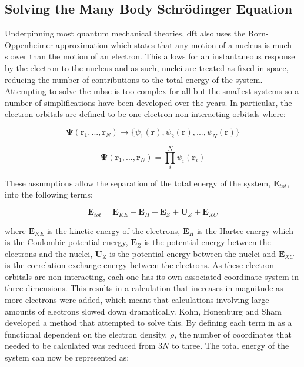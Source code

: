 \subsection{Solving the Many Body Schr\"{o}dinger Equation}
Underpinning most quantum mechanical theories, \acrshort{dft} also uses the Born\nobreakdash-Oppenheimer approximation which states that any motion of a nucleus is much slower than the motion of an electron. This allows for an instantaneous response by the electron to the nucleus and as such, nuclei are treated as fixed in space, reducing the number of contributions to the total energy of the system. Attempting to solve the \acrshort{mbse} is too complex for all but the smallest systems so a number of simplifications have been developed over the years. In particular, the electron orbitals are defined to be one-electron non-interacting orbitals where:

\begin{equation}
\boldsymbol{\Psi} (\mathbf{r}_1, ..., \mathbf{r}_N) \xrightarrow{} \{\psi_1(\mathbf{r}),  \psi_2(\mathbf{r}), ..., \psi_N(\mathbf{r})\}
\end{equation}

\begin{equation}
\boldsymbol{\Psi}(\mathbf{r}_1, ..., \mathbf{r}_N) = \prod_i^N \psi_i (\mathbf{r}_i)
\end{equation}

These assumptions allow the separation of the total energy of the system, \(\boldsymbol{E}_{tot}\), into the following terms:

\begin{equation}
\boldsymbol{E}_{tot} = \boldsymbol{E}_{KE} + \boldsymbol{E}_{H} + \boldsymbol{E}_{Z} + \boldsymbol{U}_{Z} + \boldsymbol{E}_{XC} 
\label{eqn:GSComponents}
\end{equation}

where \(\boldsymbol{E}_{KE}\) is the kinetic energy of the electrons, \(\boldsymbol{E}_{H}\) is the Hartee energy which is the Coulombic potential energy, \(\boldsymbol{E}_{Z}\) is the potential energy between the electrons and the nuclei, \(\boldsymbol{U}_{Z}\) is the potential energy between the nuclei and \(\boldsymbol{E}_{XC}\) is the correlation exchange energy between the electrons. As these electron orbitals are non-interacting, each one has its own associated coordinate system in three dimensions. This results in a calculation that increases in magnitude as more electrons were added, which meant that calculations involving large amounts of electrons slowed down dramatically. Kohn, Honenburg and Sham~\cite{Kohn1965, Hohenberg1964} developed a method that attempted to solve this. By defining each term in  as a functional dependent on the electron density, \(\rho\), the number of coordinates that needed to be calculated was reduced from \(3N\) to three. The total energy of the system can now be represented as:

